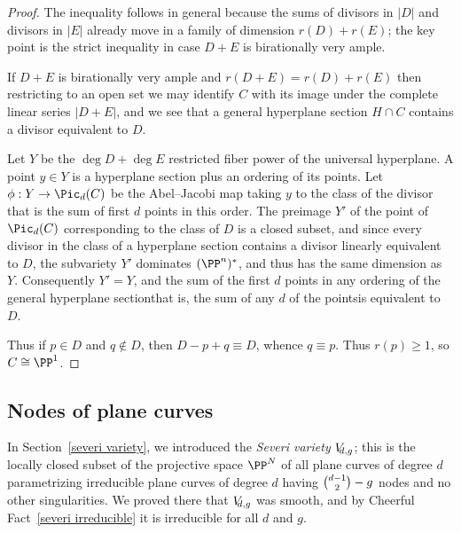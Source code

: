 \begin{proof}
 The inequality follows in general because the sums of divisors in $|D|$
 and divisors in $|E|$ already move in
 a family of dimension $r(D)+r(E)$; the key point is the strict inequality
 in case $D+E$ is birationally very ample.

If $D+E$ is birationally very ample and $r(D+E) = r(D)+r(E)$ then
restricting to an open set
we may identify $C$ with its image under the complete linear series
$|D+E|$, and we see that a general hyperplane section $H\cap C$ contains
a divisor equivalent to $D$.

Let $Y$ be the $\deg D +\deg E$ restricted fiber power of the universal
hyperplane.
A point $y\in Y$ is a hyperplane section plus an ordering of its points.
Let $\phi: Y \to \Pic_d(C)$ be the 
Abel--Jacobi map
%
 taking $y$
 to the class of the divisor that is the sum of first $d$ points in this
 order. The preimage  $Y'$ of the point of $\Pic_d(C)$ corresponding to
 the class of $D$ is a closed subset, and
since every divisor in the class of a hyperplane section contains
a divisor
linearly equivalent to  $D$, the subvariety $Y'$ dominates $(\PP^{n})^*$,
and thus
has the same dimension as~$Y$. Consequently $Y'=Y$, and the sum of the
first $d$ points
in any ordering of the general hyperplane section\emdash that is, the
sum of any $d$
of the points\emdash is equivalent to $D$.

Thus if $p\in D$ and $q\notin D$, then $D-p+q \equiv D$, whence $q\equiv
p$. Thus
$r(p)\geq 1$, so $C\cong \PP^1$.
\end{proof}

\subsection*{Nodes of plane curves}

\def\VD#1{V_{\mskip-5mu d,#1}} %

In Section~\ref{severi variety}, we introduced the \emph{Severi variety}
%
$\VD{g}$; this is the locally closed subset of the projective space
$\PP^N$ of all plane curves of degree $d$ parametrizing irreducible
plane curves of degree $d$ having 
$\tbinom{d-1}{2} - \nobreak g$ 
nodes and no other singularities. We proved there that $\VD{g}$ was
smooth, and by Cheerful Fact~\ref{severi irreducible} it is irreducible
for all $d$ and $g$.

